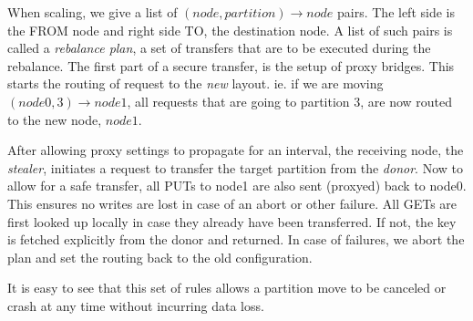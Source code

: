 When scaling, we give a list of $(node, partition) \rightarrow node$ pairs. The left side is the FROM node and right side TO, the destination node.
A list of such pairs is called a \emph{rebalance plan}, a set of transfers that are to be executed during the rebalance.
The first part of a secure transfer, is the setup of proxy bridges. This starts the routing of request to the \emph{new} layout. ie. if we are moving $(node0, 3) \rightarrow node1$, all requests that are going to partition 3, are now routed to the new node, $node1$. 

After allowing proxy settings to propagate for an interval, the receiving node, the \emph{stealer}, initiates a request to transfer the target partition from the \emph{donor}. 
Now to allow for a safe transfer, all PUTs to node1 are also sent (proxyed) back to node0. This ensures no writes are lost in case of an abort or other failure. All GETs are first looked up locally in case they already have been transferred. If not, the key is fetched explicitly from the donor and returned.
In case of failures, we abort the plan and set the routing back to the old configuration.

It is easy to see that this set of rules allows a partition move to be canceled or crash at any time without incurring data loss.










